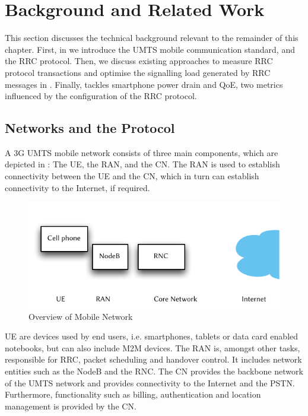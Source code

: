 \section{Background and Related Work}\label{sec:network:background}
This section discusses the technical background relevant to the remainder of this chapter.
First, in  we introduce the \gls{UMTS} mobile communication standard, and the \gls{RRC} protocol.
Then, we discuss existing approaches to measure \gls{RRC} protocol transactions and optimise the signalling load generated by \gls{RRC} messages in .
Finally,  tackles smartphone power drain and \gls{QoE}, two metrics influenced by the configuration of the \gls{RRC} protocol.

\subsection{ Networks and the  Protocol}\label{sec:network:background:umts_rrc}
A \gls{3G} \gls{UMTS} mobile network consists of three main components, which are depicted in : The \gls{UE}, the \gls{RAN}, and the \gls{CN}.
The \gls{RAN} is used to establish connectivity between the \gls{UE} and the \gls{CN}, which in turn can establish connectivity to the Internet, if required.

\begin{figure}
	\centering
	\includegraphics{network/background/figures/mobile_network_overview}
	\caption{Overview of Mobile Network}
	\label{fig:network:background:mobile_network_overview}
\end{figure}

\gls{UE} are devices used by end users, i.e. smartphones, tablets or data card enabled notebooks, but can also include \gls{M2M} devices.
The \gls{RAN} is, amongst other tasks, responsible for \gls{RRC}, packet scheduling and handover control.
It includes network entities such as the \gls{NodeB} and the \gls{RNC}.
The \gls{CN} provides the backbone network of the \gls{UMTS} network and provides connectivity to the Internet and the \gls{PSTN}.
Furthermore, functionality such as billing, authentication and location management is provided by the \gls{CN}.

